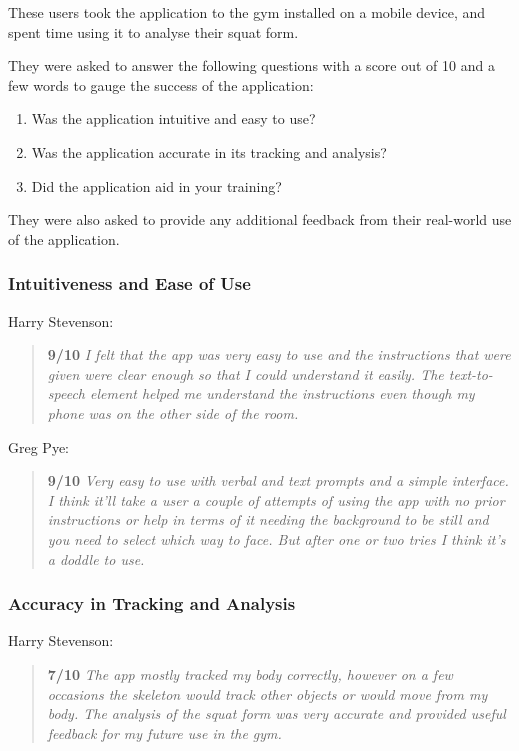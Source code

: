 These users took the application to the gym installed on a mobile device, and spent time using it to analyse their squat form.

They were asked to answer the following questions with a score out of 10 and a few words to gauge the success of the application:

\begin{enumerate}
    \item Was the application intuitive and easy to use?
    \item Was the application accurate in its tracking and analysis?
    \item Did the application aid in your training?
\end{enumerate}

They were also asked to provide any additional feedback from their real-world use of the application.

\subsubsection{Intuitiveness and Ease of Use}

Harry Stevenson:
\begin{quote}
\textbf{9/10} \emph{I felt that the app was very easy to use and the instructions that were given were clear enough so that I could understand it easily. The text-to-speech element helped me understand the instructions even though my phone was on the other side of the room.}
\end{quote}

Greg Pye:
\begin{quote}
\textbf{9/10} \emph{Very easy to use with verbal and text prompts and a simple interface. I think it'll take a user a couple of attempts of using the app with no prior instructions or help in terms of it needing the background to be still and you need to select which way to face. But after one or two tries I think it's a doddle to use.}
\end{quote}

\subsubsection{Accuracy in Tracking and Analysis}

Harry Stevenson:
\begin{quote}
\textbf{7/10} \emph{The app mostly tracked my body correctly, however on a few occasions the skeleton would track other objects or would move from my body. The analysis of the squat form was very accurate and provided useful feedback for my future use in the gym.}
\end{quote}

